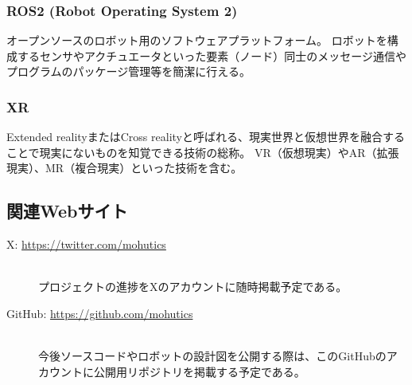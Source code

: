 \documentclass[uplatex,a4paper,12pt]{jsarticle}
\begin{document}
\subsubsection*{ROS2 (Robot Operating System 2) \label{term:ros2}}
オープンソースのロボット用のソフトウェアプラットフォーム。
ロボットを構成するセンサやアクチュエータといった要素（ノード）同士のメッセージ通信やプログラムのパッケージ管理等を簡潔に行える。

\subsubsection*{XR \label{term:xr}}
Extended realityまたはCross realityと呼ばれる、現実世界と仮想世界を融合することで現実にないものを知覚できる技術の総称。
VR（仮想現実）やAR（拡張現実）、MR（複合現実）といった技術を含む。

\subsection{関連Webサイト}
\begin{description}
  \item[X: \url{https://twitter.com/mohutics}]\mbox{}\\
  プロジェクトの進捗をXのアカウントに随時掲載予定である。
  \item[GitHub: \url{https://github.com/mohutics}]\mbox{}\\
  今後ソースコードやロボットの設計図を公開する際は、このGitHubのアカウントに公開用リポジトリを掲載する予定である。
\end{description}







\end{document}
